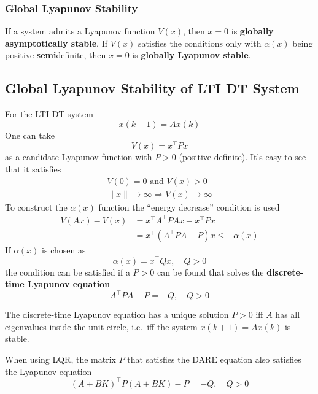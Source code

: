 \subsubsection{Global Lyapunov Stability}

If a system admits a Lyapunov function $V(x)$, then $x=0$ is \textbf{globally asymptotically stable}.
\newpar{}
If $V(x)$ satisfies the conditions only with $\alpha(x)$ being positive \textbf{semi}definite, then $x=0$ is \textbf{globally Lyapunov stable}.

\subsection{Global Lyapunov Stability of LTI DT System}
For the LTI DT system
\begin{equation*}
    x(k+1)=Ax(k)
\end{equation*}
One can take
\begin{equation*}
    V(x) = x^\top Px
\end{equation*}
as a candidate Lyapunov function with $P>0$ (positive definite). It's easy to see that it satisfies
\begin{gather*}
    V(0) = 0 \text{ and } V(x) > 0 \\
    \lVert x \rVert \to \infty \Rightarrow V(x) \to \infty
\end{gather*}
To construct the $\alpha(x)$ function the ``energy decrease'' condition is used
\begin{align*}
    V(Ax) - V(x) & = x^\top A^\top PAx - x^\top Px                      \\
                 & = x^\top \left(A^\top PA - P\right)x \leq -\alpha(x)
\end{align*}
If $\alpha(x)$ is chosen as
\begin{equation*}
    \alpha(x) = x^\top Qx, \quad Q > 0
\end{equation*}
the condition can be satisfied if a $P>0$ can be found that solves the \textbf{discrete-time Lyapunov equation}
\begin{equation*}
    A^\top PA -P = -Q, \quad Q > 0
\end{equation*}

The discrete-time Lyapunov equation has a unique solution $P > 0$ iff $A$ has all eigenvalues inside the unit circle, i.e.\ iff the system $x(k + 1) = Ax(k)$ is stable.

\newpar{}

When using LQR, the matrix $P$ that satisfies the DARE equation also satisfies the Lyapunov equation
\begin{equation*}
    {(A+BK)}^\top P{(A+BK)} -P = -Q, \quad Q>0
\end{equation*}

